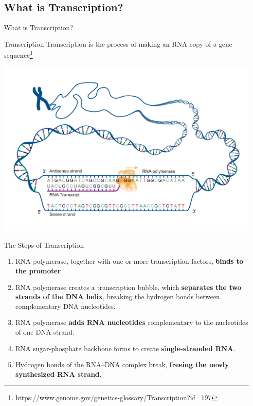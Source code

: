 \documentclass[11pt]{beamer}
\begin{document}
\subsection{What is Transcription?}

\begin{frame}{What is Transcription?}

	\begin{block}{Transcription}
		Transcription is the process of making an RNA copy of a gene sequence\footnote{https://www.genome.gov/genetics-glossary/Transcription?id=197}
	\end{block}

	\begin{center}
	\includegraphics[scale=0.14]{figures/transcription.jpg} 
	\end{center}

\end{frame}

\begin{frame}{The Steps of Transcription}

	\begin{enumerate}
		\item RNA polymerase, together with one or more transcription factors, \textbf{binds to the promoter}
		\item RNA polymerase creates a transcription bubble, which \textbf{separates the two strands of the DNA helix}, breaking the hydrogen bonds between complementary DNA nucleotides.
		\item RNA polymerase \textbf{adds RNA nucleotides} complementary to the nucleotides of one DNA strand.
		\item RNA sugar-phosphate backbone forms to create \textbf{single-stranded RNA}.
		\item Hydrogen bonds of the RNA–DNA complex break, \textbf{freeing the newly synthesized RNA strand}.\\
	\end{enumerate}

\end{frame}
\end{document}
